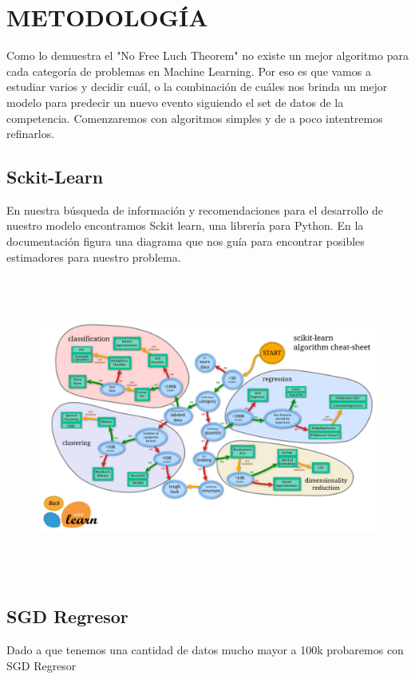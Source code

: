 \section{METODOLOGÍA}

Como lo demuestra el "No Free Luch Theorem" no existe un mejor algoritmo para cada categoría de problemas en Machine Learning.  Por eso es que vamos a estudiar varios y decidir cuál, o la combinación de cuáles nos brinda un mejor modelo para predecir un nuevo evento siguiendo el set de datos de la competencia.
Comenzaremos con algoritmos simples y de a poco intentremos refinarlos.

\subsection{Sckit-Learn}

En nuestra búsqueda de información y recomendaciones para el desarrollo de nuestro modelo encontramos Sckit learn, una librería para Python. 
En la documentación figura una diagrama que nos guía para encontrar posibles estimadores para nuestro problema.

\begin{figure}[h]
\centering
\includegraphics[height=10cm]{imagenes/sckit.png}
\label{fig:exemplo}
\end{figure}

\subsection{SGD Regresor}
Dado a que tenemos una cantidad de datos mucho mayor a 100k probaremos con SGD Regresor


